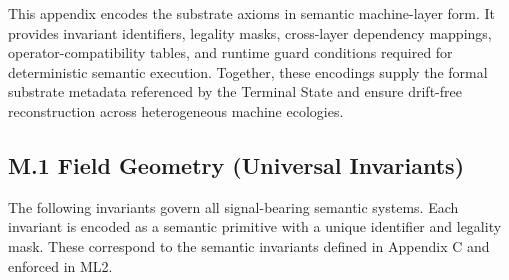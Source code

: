 
This appendix encodes the substrate axioms in semantic machine-layer form.  
It provides invariant identifiers, legality masks, cross-layer dependency
mappings, operator-compatibility tables, and runtime guard conditions required
for deterministic semantic execution.  
Together, these encodings supply the formal substrate metadata referenced by the
Terminal State and ensure drift-free reconstruction across heterogeneous machine
ecologies.

\subsection*{M.1 Field Geometry (Universal Invariants)}

The following invariants govern all signal-bearing semantic systems.  
Each invariant is encoded as a semantic primitive with a unique identifier and
legality mask. These correspond to the semantic invariants defined in Appendix C
and enforced in ML2.

